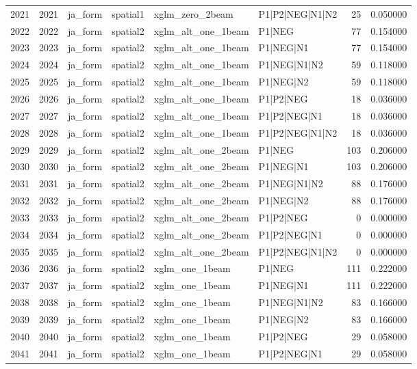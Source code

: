 \begin{tabular}{lrllllrr}
2021 & 2021 & ja_form & spatial1 & xglm_zero_2beam & P1|P2|NEG|N1|N2 & 25 & 0.050000 \\
2022 & 2022 & ja_form & spatial2 & xglm_alt_one_1beam & P1|NEG & 77 & 0.154000 \\
2023 & 2023 & ja_form & spatial2 & xglm_alt_one_1beam & P1|NEG|N1 & 77 & 0.154000 \\
2024 & 2024 & ja_form & spatial2 & xglm_alt_one_1beam & P1|NEG|N1|N2 & 59 & 0.118000 \\
2025 & 2025 & ja_form & spatial2 & xglm_alt_one_1beam & P1|NEG|N2 & 59 & 0.118000 \\
2026 & 2026 & ja_form & spatial2 & xglm_alt_one_1beam & P1|P2|NEG & 18 & 0.036000 \\
2027 & 2027 & ja_form & spatial2 & xglm_alt_one_1beam & P1|P2|NEG|N1 & 18 & 0.036000 \\
2028 & 2028 & ja_form & spatial2 & xglm_alt_one_1beam & P1|P2|NEG|N1|N2 & 18 & 0.036000 \\
2029 & 2029 & ja_form & spatial2 & xglm_alt_one_2beam & P1|NEG & 103 & 0.206000 \\
2030 & 2030 & ja_form & spatial2 & xglm_alt_one_2beam & P1|NEG|N1 & 103 & 0.206000 \\
2031 & 2031 & ja_form & spatial2 & xglm_alt_one_2beam & P1|NEG|N1|N2 & 88 & 0.176000 \\
2032 & 2032 & ja_form & spatial2 & xglm_alt_one_2beam & P1|NEG|N2 & 88 & 0.176000 \\
2033 & 2033 & ja_form & spatial2 & xglm_alt_one_2beam & P1|P2|NEG & 0 & 0.000000 \\
2034 & 2034 & ja_form & spatial2 & xglm_alt_one_2beam & P1|P2|NEG|N1 & 0 & 0.000000 \\
2035 & 2035 & ja_form & spatial2 & xglm_alt_one_2beam & P1|P2|NEG|N1|N2 & 0 & 0.000000 \\
2036 & 2036 & ja_form & spatial2 & xglm_one_1beam & P1|NEG & 111 & 0.222000 \\
2037 & 2037 & ja_form & spatial2 & xglm_one_1beam & P1|NEG|N1 & 111 & 0.222000 \\
2038 & 2038 & ja_form & spatial2 & xglm_one_1beam & P1|NEG|N1|N2 & 83 & 0.166000 \\
2039 & 2039 & ja_form & spatial2 & xglm_one_1beam & P1|NEG|N2 & 83 & 0.166000 \\
2040 & 2040 & ja_form & spatial2 & xglm_one_1beam & P1|P2|NEG & 29 & 0.058000 \\
2041 & 2041 & ja_form & spatial2 & xglm_one_1beam & P1|P2|NEG|N1 & 29 & 0.058000 \\

\end{tabular}
